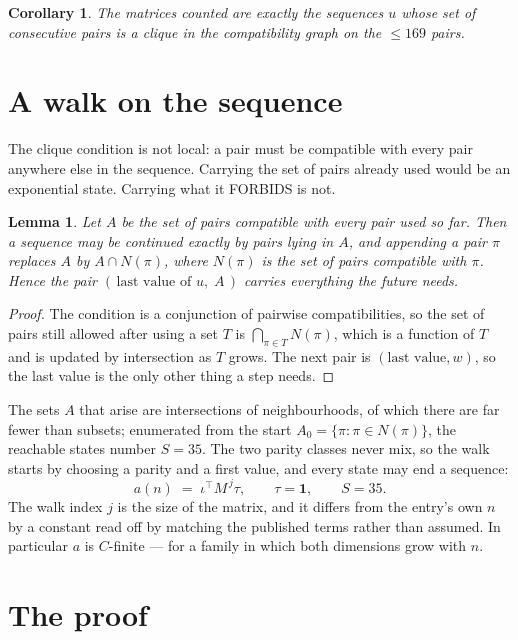 \documentclass[11pt,a4paper]{article}
\theoremstyle{plain}
\newtheorem{lemma}[theorem]{Lemma}
\newtheorem{corollary}[theorem]{Corollary}
\theoremstyle{definition}
\begin{document}
\begin{corollary}
The matrices counted are exactly the sequences $u$ whose set of consecutive pairs is a clique in
the compatibility graph on the $\le 169$ pairs.
\end{corollary}

\section{A walk on the sequence}

The clique condition is not local: a pair must be compatible with every pair anywhere else in
the sequence. Carrying the set of pairs already used would be an exponential state. Carrying
what it FORBIDS is not.

\begin{lemma}\label{lem:lump}
Let $A$ be the set of pairs compatible with every pair used so far. Then a sequence may be
continued exactly by pairs lying in $A$, and appending a pair $\pi$ replaces $A$ by
$A\cap N(\pi)$, where $N(\pi)$ is the set of pairs compatible with $\pi$. Hence the pair
$(\,\text{last value of }u,\;A\,)$ carries everything the future needs.
\end{lemma}

\begin{proof}
The condition is a conjunction of pairwise compatibilities, so the set of pairs still allowed
after using a set $T$ is $\bigcap_{\pi\in T}N(\pi)$, which is a function of $T$ and is updated
by intersection as $T$ grows. The next pair is $(\text{last value},w)$, so the last value is
the only other thing a step needs.
\end{proof}

The sets $A$ that arise are intersections of neighbourhoods, of which there are far fewer than
subsets; enumerated from the start $A_0=\{\pi:\pi\in N(\pi)\}$, the reachable states number
$S=35$. The two parity classes never mix, so the walk starts by choosing a parity and a first
value, and every state may end a sequence:
\[
a(n)\;=\;\iota^{\!\top}M^{\,j}\tau ,\qquad \tau=\mathbf{1},\qquad S=35.
\]
The walk index $j$ is the size of the matrix, and it differs from the entry's own $n$ by a
constant read off by matching the published terms rather than assumed. In particular $a$ is
$C$-finite --- for a family in which both dimensions grow with $n$.

\section{The proof}
\end{document}
